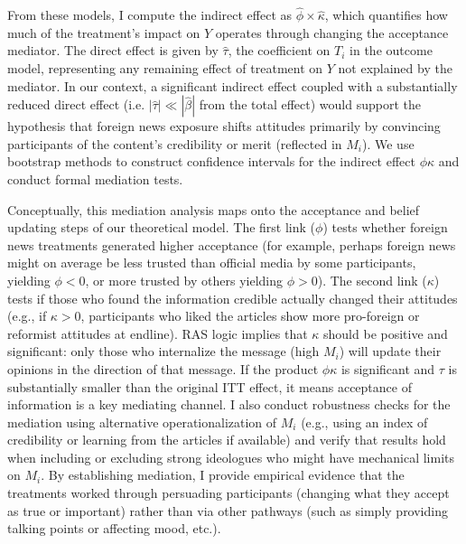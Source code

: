 \documentclass[12pt, american]{article}
\begin{document}
From these models, I compute the indirect effect as $\hat{\phi} \times \hat{\kappa}$, which quantifies how much of the treatment’s impact on $Y$ operates through changing the acceptance mediator. The direct effect is given by $\hat{\tau}$, the coefficient on $T_i$ in the outcome model, representing any remaining effect of treatment on $Y$ not explained by the mediator. In our context, a significant indirect effect coupled with a substantially reduced direct effect (i.e. $|\hat{\tau}| \ll |\hat{\beta}|$ from the total effect) would support the hypothesis that foreign news exposure shifts attitudes primarily by convincing participants of the content’s credibility or merit (reflected in $M_i$). We use bootstrap methods to construct confidence intervals for the indirect effect $\phi\kappa$ and conduct formal mediation tests. 

Conceptually, this mediation analysis maps onto the acceptance and belief updating steps of our theoretical model. The first link ($\phi$) tests whether foreign news treatments generated higher acceptance (for example, perhaps foreign news might on average be less trusted than official media by some participants, yielding $\phi<0$, or more trusted by others yielding $\phi>0$). The second link ($\kappa$) tests if those who found the information credible actually changed their attitudes (e.g., if $\kappa>0$, participants who liked the articles show more pro-foreign or reformist attitudes at endline). RAS logic implies that $\kappa$ should be positive and significant: only those who internalize the message (high $M_i$) will update their opinions in the direction of that message. If the product $\phi\kappa$ is significant and $\tau$ is substantially smaller than the original ITT effect, it means acceptance of information is a key mediating channel. I also conduct robustness checks for the mediation using alternative operationalization of $M_i$ (e.g., using an index of credibility or learning from the articles if available) and verify that results hold when including or excluding strong ideologues who might have mechanical limits on $M_i$. By establishing mediation, I provide empirical evidence that the treatments worked through persuading participants (changing what they accept as true or important) rather than via other pathways (such as simply providing talking points or affecting mood, etc.).
\end{document}
